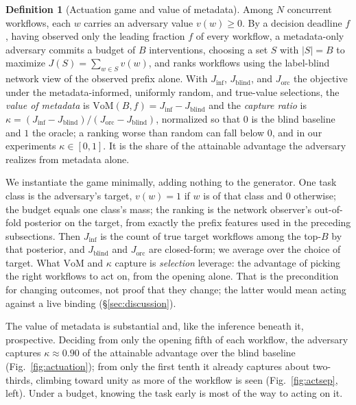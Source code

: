 \documentclass[10pt,twocolumn]{article}
\theoremstyle{definition}
\newtheorem{definition}{Definition}
\begin{document}
\begin{definition}[Actuation game and value of metadata]\label{def:vom}
Among $N$ concurrent workflows, each $w$ carries an adversary value $v(w)\ge 0$. By a
decision deadline $f$, having observed only the leading fraction $f$ of every
workflow, a metadata-only adversary commits a budget of $B$ interventions, choosing a
set $S$ with $|S|=B$ to maximize $J(S)=\sum_{w\in S} v(w)$, and ranks workflows using
the label-blind network view of the observed prefix alone. With $J_{\mathrm{inf}}$,
$J_{\mathrm{blind}}$, and $J_{\mathrm{orc}}$ the objective under the
metadata-informed, uniformly random, and true-value selections, the \emph{value of
metadata} is $\mathrm{VoM}(B,f)=J_{\mathrm{inf}}-J_{\mathrm{blind}}$ and the
\emph{capture ratio} is
$\kappa=(J_{\mathrm{inf}}-J_{\mathrm{blind}})/(J_{\mathrm{orc}}-J_{\mathrm{blind}})$,
normalized so that $0$ is the blind baseline and $1$ the oracle; a ranking worse than
random can fall below $0$, and in our experiments $\kappa\in[0,1]$. It is the share of
the attainable advantage the adversary realizes from metadata alone.
\end{definition}

We instantiate the game minimally, adding nothing to the generator. One task class is
the adversary's target, $v(w)=1$ if $w$ is of that class and $0$ otherwise; the budget
equals one class's mass; the ranking is the network observer's out-of-fold posterior
on the target, from exactly the prefix features used in the preceding subsections. Then
$J_{\mathrm{inf}}$ is the count of true target workflows among the top-$B$ by that
posterior, and $J_{\mathrm{blind}}$ and $J_{\mathrm{orc}}$ are closed-form; we average
over the choice of target. What $\mathrm{VoM}$ and $\kappa$ capture is \emph{selection}
leverage: the advantage of picking the right workflows to act on, from the opening
alone. That is the precondition for changing outcomes, not proof that they change;
the latter would mean acting against a live binding (\S\ref{sec:discussion}).

The value of metadata is substantial and, like the inference beneath it, prospective.
Deciding from only the opening fifth of each workflow, the adversary captures
$\kappa\approx0.90$ of the attainable advantage over the blind baseline
(Fig.~\ref{fig:actuation}); from only the first tenth it already captures about
two-thirds, climbing toward unity as more of the workflow is seen
(Fig.~\ref{fig:actsep}, left). Under a budget, knowing the task early is most of the
way to acting on it.
\end{document}
